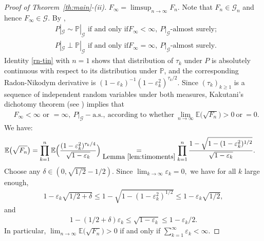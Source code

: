 \documentclass[12pt]{amsart}
\begin{document}
\begin{proof}[Proof of Theorem~\ref{th:main}-(ii)]
$F_{\infty} = \limsup_{n\to\infty} F_n.$ Note that $F_n\in {{\mathcal G}}_n$
and hence $F_{\infty}\in{{\mathcal G}}$. By \cite[Theorem~3.3,
p.~242]{durrett},
\begin{align*}
&P|_{{\mathcal G}}\sim{{\mathbb P}}|_{{\mathcal G}}\mbox{ if and only if
}F_{\infty}<\infty,~ P|_{{\mathcal G}}\mbox{-almost
surely};\\&P|_{{\mathcal G}}\perp {{\mathbb P}}|_{{\mathcal G}}\text{ if and only if
}F_{\infty}=\infty, ~P|_{{\mathcal G}}\mbox{-almost surely}.
\end{align*}
Identity \eqref{rn-tin} with $n=1$ shows that distribution of
$\tau_k$ under $P$ is absolutely continuous with respect to its
distribution under ${{\mathbb P}}$, and the corresponding Radon-Nikodym
derivative is $(1-{\varepsilon}_k)^{-1}(1-{\varepsilon}_k^2)^{\tau_k/2}$. Since
$(\tau_k)_{k\ge 1}$ is a sequence of independent random variables
under both measures, Kakutani's dichotomy theorem (see
\cite[p.~244]{durrett}) implies that
\begin{align*}
& F_{\infty}<\infty\mbox{ or }=\infty,~ P|_{{\mathcal G}}-\mbox{a.s.},
~\mbox{according to whether}~\lim_{n\to\infty} {{\mathbb E}}\bigl(
\sqrt{F_n}\bigr)>0~\mbox{or}~= 0.
\end{align*}
We have:
\begin{align*}
{{\mathbb E}}\bigl( \sqrt{F_n}\bigr)& =  \prod_{k=1}^n {{\mathbb E}}\Bigl(
\frac{(1-{\varepsilon}_k^2)^{\tau_k/4}}{\sqrt{1-{\varepsilon}_k}} \Bigr)
\underset{\mbox{Lemma } \ref{lem:timoments}}{=} \prod_{k=1}^n
\frac{1-\sqrt{1-(1-{\varepsilon}_k^2)^{1/2}}}{\sqrt{1-{\varepsilon}_k}}.
\end{align*}
Choose any $\delta\in (0,\sqrt{1/2}-1/2).$ Since $\lim_{k\to\infty} {\varepsilon}_k=0,$ we have for all $k$ large enough,
\begin{eqnarray*}
1-{\varepsilon}_k\sqrt{1/2+\delta}\leq 1-\sqrt{1-(1-{\varepsilon}_k^2)^{1/2}} \leq 1-{\varepsilon}_k \sqrt{1/2},
\end{eqnarray*}
and
\begin{eqnarray*}
1-(1/2+\delta){\varepsilon}_k\leq \sqrt{1-{\varepsilon}_k}\leq 1-{\varepsilon}_k/2.
\end{eqnarray*}
In particular, $\lim_{n\to\infty} {{\mathbb E}}\bigl( \sqrt{F_n}\bigr)>0$ if
and only if $\sum_{k=1}^{\infty} {\varepsilon}_k <\infty$.
\end{proof}
\end{document}
